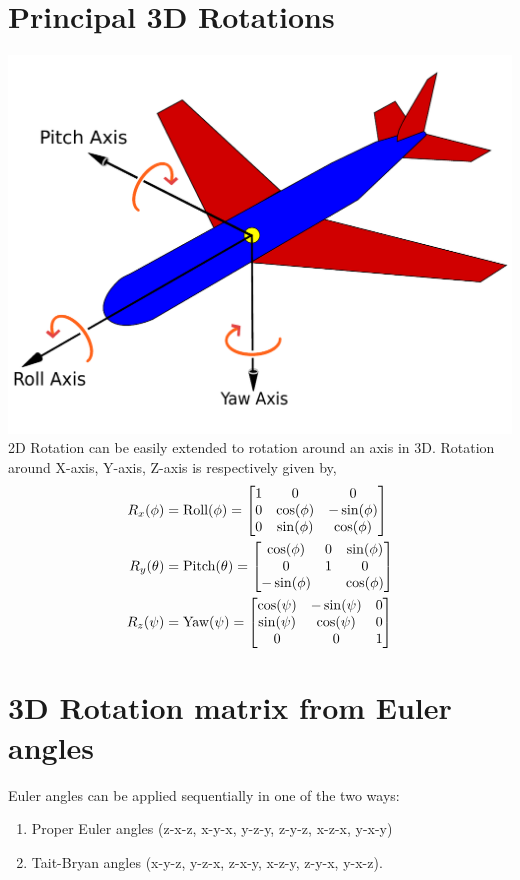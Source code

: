 \documentclass{article}
\begin{document}
\section{Principal 3D  Rotations}
\includegraphics[width=\linewidth]{media/euler-angles.pdf}
2D Rotation can be  easily extended to rotation around an axis  in 3D.  Rotation
around  X-axis, Y-axis, Z-axis   is respectively given  by,
\begin{align}
  R_x(\phi) &= \text{Roll}(\phi)  = \begin{bmatrix}
    1  &  0 &  0 \\
    0  &  \cos(\phi)  &  -  \sin(\phi) \\
    0  &  \sin(\phi)  &  \cos(\phi)
    \end{bmatrix}
  \notag\\
  R_y(\theta) & = \text{Pitch}(\theta)  = \begin{bmatrix}
    \cos(\phi)  &  0 &  \sin(\phi) \\
    0  &  1 &  0 \\
    -\sin(\phi)  &   & \cos(\phi)
  \end{bmatrix}
\notag\\
  R_z(\psi) & = \text{Yaw}(\psi)  = \begin{bmatrix}
    \cos(\psi)  &  -  \sin(\psi)  & 0    \\
    \sin(\psi)  &  \cos(\psi)  &  0   \\
    0 &  0     &   1
  \end{bmatrix}
\end{align}
\section{3D  Rotation matrix   from Euler  angles}
Euler  angles   can be applied sequentially  in  one  of the two ways:
\begin{enumerate}
  \item Proper Euler angles (z-x-z, x-y-x, y-z-y, z-y-z, x-z-x, y-x-y)
  \item Tait-Bryan angles   (x-y-z, y-z-x, z-x-y, x-z-y, z-y-x, y-x-z).
  \end{enumerate}
  
\end{document}
